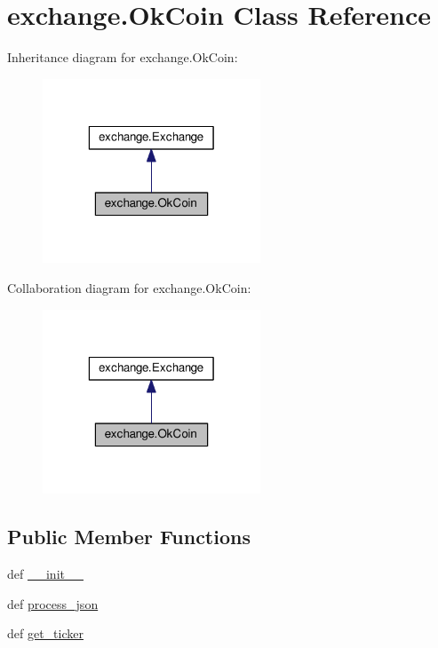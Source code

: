 \hypertarget{classexchange_1_1_ok_coin}{\section{exchange.\-Ok\-Coin Class Reference}
\label{classexchange_1_1_ok_coin}
}


Inheritance diagram for exchange.\-Ok\-Coin\-:
\nopagebreak
\begin{figure}[H]
\begin{center}
\leavevmode
\includegraphics[width=184pt]{classexchange_1_1_ok_coin__inherit__graph}
\end{center}
\end{figure}


Collaboration diagram for exchange.\-Ok\-Coin\-:
\nopagebreak
\begin{figure}[H]
\begin{center}
\leavevmode
\includegraphics[width=184pt]{classexchange_1_1_ok_coin__coll__graph}
\end{center}
\end{figure}
\subsection*{Public Member Functions}
\begin{DoxyCompactItemize}
\item 
def \hyperlink{classexchange_1_1_ok_coin_a2df16234d373d0ac04a019917e612b70}{\-\_\-\-\_\-init\-\_\-\-\_\-}
\item 
def \hyperlink{classexchange_1_1_ok_coin_accf1d2bd5080a096f37fe64282acf915}{process\-\_\-json}
\item 
def \hyperlink{classexchange_1_1_ok_coin_ae4fed29a4c9e9466849b05f4c0537eba}{get\-\_\-ticker}
\end{DoxyCompactItemize}
